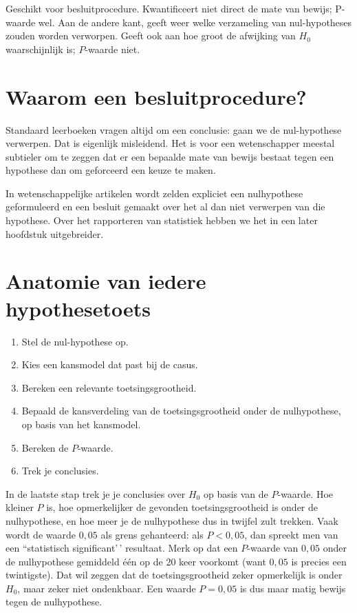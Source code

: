 \documentclass[
  a4paper,
]{scrbook}
\providecommand{\tightlist}{%
  \setlength{\itemsep}{0pt}\setlength{\parskip}{0pt}}\usepackage{longtable,booktabs,array}
\theoremstyle{definition}
\theoremstyle{definition}
\theoremstyle{remark}
\begin{document}
Geschikt voor besluitprocedure. Kwantificeert niet direct de mate van
bewijs; P-waarde wel. Aan de andere kant, geeft weer welke verzameling
van nul-hypotheses zouden worden verworpen. Geeft ook aan hoe groot de
afwijking van \(H_\textrm{0}\) waarschijnlijk is; \(P\)-waarde niet.

\section{Waarom een
besluitprocedure?}\label{waarom-een-besluitprocedure}

Standaard leerboeken vragen altijd om een conclusie: gaan we de
nul-hypothese verwerpen. Dat is eigenlijk misleidend. Het is voor een
wetenschapper meestal subtieler om te zeggen dat er een bepaalde mate
van bewijs bestaat tegen een hypothese dan om geforceerd een keuze te
maken.

In wetenschappelijke artikelen wordt zelden expliciet een nulhypothese
geformuleerd en een besluit gemaakt over het al dan niet verwerpen van
die hypothese. Over het rapporteren van statistiek hebben we het in een
later hoofdstuk uitgebreider.

\section{Anatomie van iedere
hypothesetoets}\label{anatomie-van-iedere-hypothesetoets}

\label{stap:nulhypothese}

\begin{enumerate}
\def\labelenumi{\arabic{enumi}.}
\tightlist
\item
  Stel de nul-hypothese op.
\item
  Kies een kansmodel dat past bij de casus.
\item
  Bereken een relevante toetsingsgrootheid.
\item
  Bepaald de kansverdeling van de toetsingsgrootheid onder de
  nulhypothese, op basis van het kansmodel.
\item
  Bereken de \(P\)-waarde.
\item
  Trek je conclusies.
\end{enumerate}

In de laatste stap trek je je conclusies over \(H_\textrm{0}\) op basis
van de \(P\)-waarde. Hoe kleiner \(P\) is, hoe opmerkelijker de gevonden
toetsingsgrootheid is onder de nulhypothese, en hoe meer je de
nulhypothese dus in twijfel zult trekken. Vaak wordt de waarde
\(0{,}05\) als grens gehanteerd: als \(P < 0{,}05\), dan spreekt men van
een ``statistisch significant'\,' resultaat. Merk op dat een
\(P\)-waarde van \(0{,}05\) onder de nulhypothese gemiddeld één op de 20
keer voorkomt (want \(0{,}05\) is precies een twintigste). Dat wil
zeggen dat de toetsingsgrootheid zeker opmerkelijk is onder
\(H_\textrm{0}\), maar zeker niet ondenkbaar. Een waarde \(P = 0{,}05\)
is dus maar matig bewijs tegen de nulhypothese.
\end{document}
